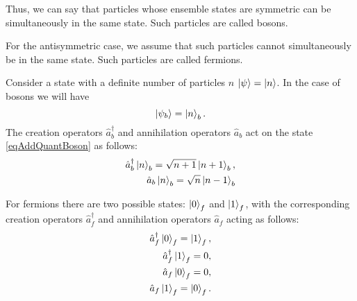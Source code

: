 Thus, we can say that particles
whose ensemble states are symmetric can be simultaneously in
the same state. Such particles are called bosons.

For the antisymmetric case, we 
assume that such particles cannot simultaneously be in
the same state. Such particles are called fermions.

Consider a state with a definite number of particles $n$
$\left|\psi\right> = \ket{n}$. In the case of bosons 
we will have 
\begin{equation}
\left|\psi_b\right> = \ket{n}_b.
\label{eqAddQuantBoson}
\end{equation}
The creation operators $\hat{a}_b^{\dag}$ and annihilation operators $\hat{a}_b$ act on
the state \eqref{eqAddQuantBoson} as follows:
\begin{eqnarray}
\hat{a}_b^{\dag}\ket{n}_b = \sqrt{n+1}\ket{n+1}_b, 
\nonumber \\
\hat{a}_b\ket{n}_b = \sqrt{n}\ket{n-1}_b
\nonumber
\end{eqnarray}

For fermions  there are two possible states: $\ket{0}_f$ and
$\ket{1}_f$, with the corresponding creation
operators $\hat{a}_f^{\dag}$ and annihilation operators $\hat{a}_f$ acting as follows:
\begin{eqnarray}
\hat{a}_f^{\dag}\ket{0}_f = \ket{1}_f, 
\nonumber \\
\hat{a}_f^{\dag}\ket{1}_f = 0, 
\nonumber \\
\hat{a}_f\ket{0}_f = 0, 
\nonumber \\
\hat{a}_f\ket{1}_f = \ket{0}_f.
\nonumber
\end{eqnarray}